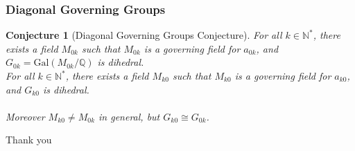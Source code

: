 \documentclass[12pt]{beamer}
\newtheorem*{conjecture}{Conjecture}
\begin{document}
	\begin{frame}
		\frametitle{Diagonal Governing Groups}
		\begin{conjecture}[Diagonal Governing Groups Conjecture]
			For all $k \in \mathbb{N}^*$, there exists a field $M_{0k}$ such that $M_{0k}$ is a governing field for $a_{0k}$, and $G_{0k} = \text{Gal}(M_{0k}/\mathbb{Q})$ is dihedral.\\
			For all $k \in \mathbb{N}^*$, there exists a field $M_{k0}$ such that $M_{k0}$ is a governing field for $a_{k0}$, and $G_{k0}$ is dihedral.\\
			\ \\
			Moreover $M_{k0} \neq M_{0k}$ in general, but $G_{k0} \cong G_{0k}$.
		\end{conjecture}
	\end{frame}

	\begin{frame}[plain]
		\begin{center}
			{\Large \color{std} Thank you}
		\end{center}
	\end{frame}
\end{document}
